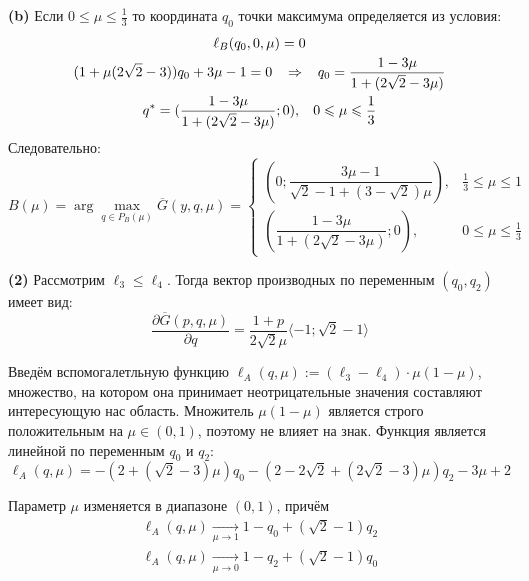 \textbf{(b)}
Если $0 \leqslant \mu \leqslant \frac{1}{3}$ то координата $q_0$ точки 
максимума определяется из условия: 	
\begin{gather*}
	\ell_B(q_0,0,\mu)=0
	\\	
	(1+\mu(2\sqrt{2}-3))q_0
	+3\mu-1=0
	\hspace{3mm} \Rightarrow \hspace{3mm}
	q_0=\frac{1-3\mu}{1+(2\sqrt{2}-3\mu)}	
	\\ 	
	q^*=(\frac{1-3\mu}{1+(2\sqrt{2}-3\mu)}; 0), \hspace{3mm}
	0 \leqslant \mu \leqslant \frac{1}{3}
\end{gather*}
Следовательно:
\begin{equation} 
	\label{eq:B_point}
	B(\mu) = \arg \max \limits_{q\in P_B(\mu)} \overline G(y,q,\mu) = 
	\begin{cases}
		(0;\dfrac{3\mu-1}{\sqrt{2}-1+(3-\sqrt{2})\mu})
		, & \frac{1}{3} \leqslant \mu \leqslant 1
		\\
		(\dfrac{1-3\mu}{1+(2\sqrt{2}-3\mu)};0)
		, & 0 \leqslant \mu \leqslant \frac{1}{3}
	\end{cases}
\end{equation}


\textbf{(2)} Рассмотрим $\ell_3 \leqslant \ell_4$.
Тогда вектор производных по переменным $(q_0,q_2)$ имеет вид:	
$$
	\frac{\partial \overline{G}(p,q,\mu)}{\partial q}=
	\frac{1+p}{2\sqrt{2}\mu} \langle -1;\sqrt{2}-1 \rangle 
$$
	
Введём вспомогалетльную функцию	
$\ell_A(q, \mu):=(\ell_3-\ell_4) \cdot \mu(1-\mu)$,
множество, на котором она принимает неотрицательные значения 
составляют интересующую нас область. Множитель $\mu(1-\mu)$ является строго
положительным на $\mu \in (0,1)$, поэтому не влияет на знак. Функция
является линейной по переменным $q_0$ и $q_2$:	
$$
	\ell_A(q, \mu)=
	-(2+(\sqrt{2}-3)\mu)q_0
	-(2-2\sqrt{2}+(2\sqrt{2}-3)\mu)q_2
	-3\mu+2
$$ 	
 	
Параметр $\mu$ изменяется в диапазоне $(0,1)$, причём		
\begin{gather*}	
	\ell_A(q,\mu) \xrightarrow[\mu\rightarrow 1]{} 
	1-q_0+(\sqrt{2}-1)q_2\\	
	\ell_A(q,\mu) \xrightarrow[\mu\rightarrow 0]{} 	
	1-q_2+(\sqrt{2}-1)q_0
\end{gather*}
	
